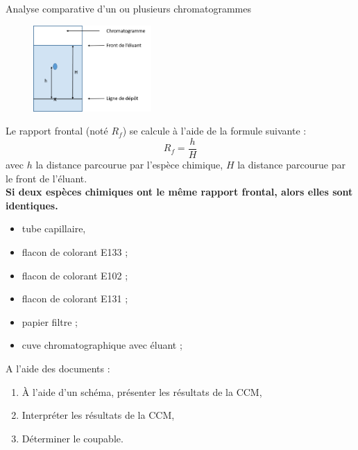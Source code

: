 \begin{doc}{Analyse comparative d'un ou plusieurs chromatogrammes}
\begin{figure}
\vspace{-1cm}
    \centering
      \includegraphics[width=0.4\textwidth]{Images/TP2/Chromatogramme.png}
  \end{figure}
    Le rapport frontal (noté $R_f$) se calcule à l'aide de la formule suivante :
\begin{equation*}
    R_f = \frac{h}{H}
\end{equation*}
avec $h$ la distance parcourue par l'espèce chimique, $H$ la distance parcourue par le front de l'éluant.\\
\textbf{Si deux espèces chimiques ont le même rapport frontal, alors elles sont identiques.}

\end{doc}



\begin{mdframed}[style=autreexo]
\textbf{}
\begin{itemize}
    \item tube capillaire,
    \item flacon de colorant E133 ;
    \item flacon de colorant E102 ;
    \item flacon de colorant E131 ;
    \item papier filtre ;
    \item cuve chromatographique avec éluant ;
\end{itemize}
\end{mdframed}
A l’aide des documents :
\begin{enumerate}
    \item À l’aide d’un schéma, présenter les résultats de la CCM,
    \item Interpréter les résultats de la CCM,
    \item Déterminer le coupable.
\end{enumerate}